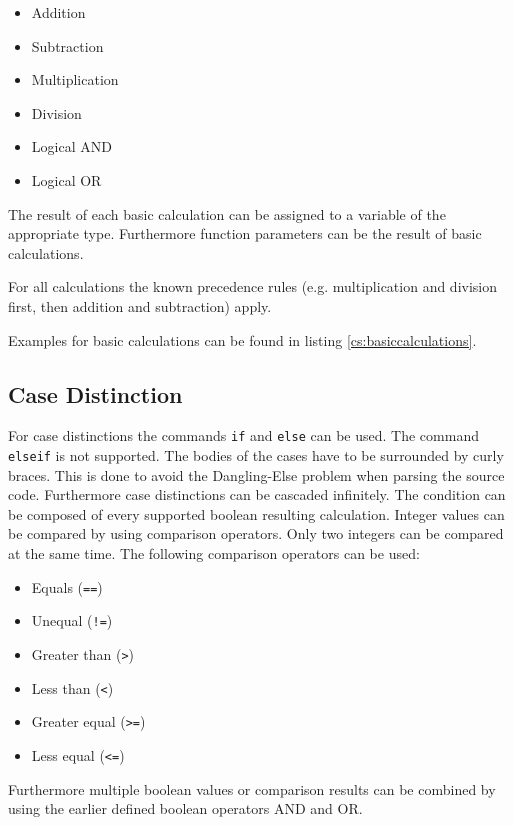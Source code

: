 \documentclass[12pt,a4paper,titlepage,oneside,final]{article}
\begin{document}
\begin{itemize}
\item Addition
\item Subtraction
\item Multiplication
\item Division
\item Logical AND
\item Logical OR
\end{itemize}

The result of each basic calculation can be assigned to a variable of the appropriate type. Furthermore function parameters can be the result of basic calculations.

For all calculations the known precedence rules (e.g. multiplication and division first, then addition and subtraction) apply.

Examples for basic calculations can be found in listing \vref{cs:basiccalculations}.



\subsection{Case Distinction}
\label{subsec:casedistinction}
For case distinctions the commands \texttt{if} and \texttt{else} can be used. The command \texttt{elseif} is not supported. The bodies of the cases have to be surrounded by curly braces. This is done to avoid the Dangling-Else problem when parsing the source code. Furthermore case distinctions can be cascaded infinitely. The condition can be composed of every supported boolean resulting calculation. Integer values can be compared by using comparison operators. Only two integers can be compared at the same time. The following comparison operators can be used:

\begin{itemize}
\item Equals (\texttt{==})
\item Unequal (\texttt{!=})
\item Greater than (\texttt{>})
\item Less than (\texttt{<})
\item Greater equal (\texttt{>=})
\item Less equal (\texttt{<=})
\end{itemize}

Furthermore multiple boolean values or comparison results can be combined by using the earlier defined boolean operators AND and OR.
\end{document}
